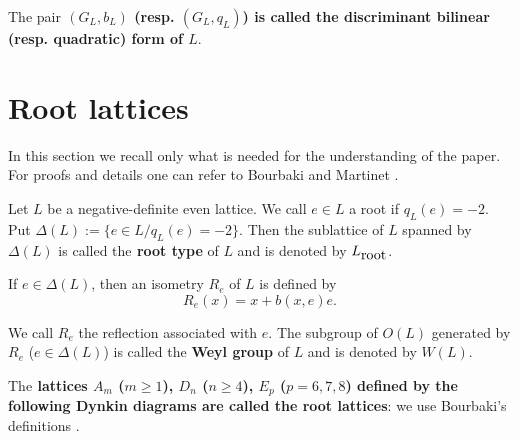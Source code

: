\documentclass{amsart}
\begin{document}
The pair{\bf{ $(G_L,b_L)$ (resp. $(G_L,q_L)$) is called the discriminant bilinear (resp. quadratic) form of $L$}}.




\section{Root lattices}

In this section we recall only what is needed for the understanding of the paper. For proofs and details one can refer to Bourbaki \cite{Bo} and Martinet \cite{Ma}.
 
Let $L$ be a negative-definite even lattice. We call $e\in L$ a root if $q_L(e)=-2$. Put $\Delta(L):=\{e\in L/ q_L(e)=-2\}$. Then the sublattice of $L$ spanned by $\Delta(L)$ is called the{\bf{ root type}} of $L$ and is denoted by {\bf{$L_{\hbox{root}}$}}.



If $e\in \Delta(L)$, then an isometry $R_e$ of $L$ is defined by
$$R_e(x)=x+b(x,e)e.$$



We call $R_e$ the reflection associated with $e$. The subgroup of $O(L)$ generated by $R_e$ ($e\in \Delta(L)$) is called the {\bf{Weyl group}} of $L$ and is denoted by $W(L)$.

\bigskip

The{\bf{ lattices $A_m$ ($m\geq 1$), $D_n$ ($n\geq 4$), $E_p$ ($p=6,7,8$) defined by the following Dynkin diagrams are called the root lattices}}: we use Bourbaki's definitions \cite{Bo}.
\end{document}

